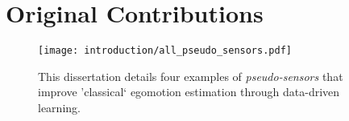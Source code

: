 %
%
% 
 
\section{Original Contributions}

\begin{figure}[h!]
\begin{center}
		\texttt{[image: introduction/all\_pseudo\_sensors.pdf]}
		\caption{This dissertation details four examples of \textit{pseudo-sensors} that improve 'classical` egomotion estimation through data-driven learning.}
  	\label{fig:intro_pseudo_sensors}
\end{center}
\end{figure}


